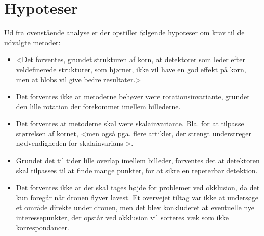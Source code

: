 \section{Hypoteser}
Ud fra ovenstående analyse er der opstillet følgende hypoteser om krav til de udvalgte metoder:
\begin{itemize}
\item{ <Det forventes, grundet strukturen af korn, at detektorer som leder efter veldefinerede strukturer, som hjørner, ikke vil have en god effekt på korn, men at blobs vil give bedre resultater.> }
\item{ Det forventes ikke at metoderne behøver være rotationsinvariante, grundet den lille rotation der forekommer imellem billederne. }
\item{Det forventes at metoderne skal være skalainvariante. Bla. for at tilpasse størrelsen af kornet, <men også pga. flere artikler, der strengt understreger nødvendigheden for skalainvarians >.}
\item{ Grundet det til tider lille overlap imellem billeder, forventes det at detektoren skal tilpasses til at finde mange punkter, for at sikre en repeterbar detektion.}
\item{Det forventes ikke at der skal tages højde for problemer ved okklusion, da det kun foregår når dronen flyver lavest. Et overvejet tiltag var ikke at undersøge et område direkte under dronen, men det blev konkluderet at eventuelle nye interessepunkter, der opstår ved okklusion vil sorteres væk som ikke korrespondancer.}
\end{itemize}